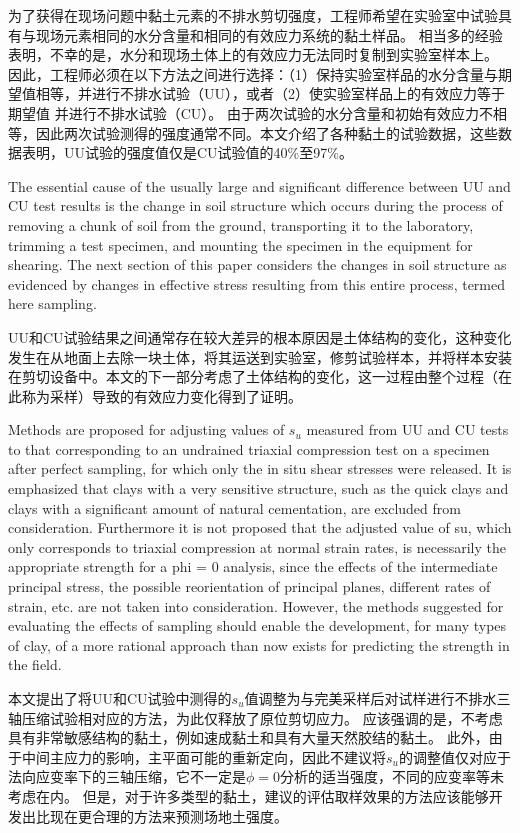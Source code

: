 \begin{paracol}{2}
    \switchcolumn

    为了获得在现场问题中黏土元素的不排水剪切强度，工程师希望在实验室中试验具有与现场元素相同的水分含量和相同的有效应力系统的黏土样品。 相当多的经验表明，不幸的是，水分和现场土体上的有效应力无法同时复制到实验室样本上。 因此，工程师必须在以下方法之间进行选择：（1）保持实验室样品的水分含量与期望值相等，并进行不排水试验（UU），或者（2）使实验室样品上的有效应力等于期望值 并进行不排水试验（CU）。 由于两次试验的水分含量和初始有效应力不相等，因此两次试验测得的强度通常不同。本文介绍了各种黏土的试验数据，这些数据表明，UU试验的强度值仅是CU试验值的40$\%$至97$\%$。

    \switchcolumn*

    The essential cause of the usually large and significant difference between UU and CU test results is the change in soil structure which occurs during the process of removing a chunk of soil from the ground, transporting it to the laboratory, trimming a test specimen, and mounting the specimen in the equipment for shearing. The next section of this paper considers the changes in soil structure as evidenced by changes in effective stress resulting from this entire process, termed here sampling. 

    \switchcolumn

    UU和CU试验结果之间通常存在较大差异的根本原因是土体结构的变化，这种变化发生在从地面上去除一块土体，将其运送到实验室，修剪试验样本，并将样本安装在剪切设备中。本文的下一部分考虑了土体结构的变化，这一过程由整个过程（在此称为采样）导致的有效应力变化得到了证明。

    \switchcolumn*
    
    Methods are proposed for adjusting values of $s_u$ measured from UU and CU tests to that corresponding to an undrained triaxial compression test on a specimen after perfect sampling, for which only the in situ shear stresses were released. It is emphasized that clays with a very sensitive structure, such as the quick clays and clays with a significant amount of natural cementation, are excluded from consideration. Furthermore it is not proposed that the adjusted value of su, which only corresponds to triaxial compression at normal strain rates, is necessarily the appropriate strength for a phi = 0 analysis, since the effects of the intermediate principal stress, the possible reorientation of principal planes, different rates of strain, etc. are not taken into consideration. However, the methods suggested for evaluating the effects of sampling should enable the development, for many types of clay, of a more rational approach than now exists for predicting the strength in the field. 

    \switchcolumn
    
    本文提出了将UU和CU试验中测得的$s_u$值调整为与完美采样后对试样进行不排水三轴压缩试验相对应的方法，为此仅释放了原位剪切应力。 应该强调的是，不考虑具有非常敏感结构的黏土，例如速成黏土和具有大量天然胶结的黏土。 此外，由于中间主应力的影响，主平面可能的重新定向，因此不建议将$s_u$的调整值仅对应于法向应变率下的三轴压缩，它不一定是$\phi=0$分析的适当强度，不同的应变率等未考虑在内。 但是，对于许多类型的黏土，建议的评估取样效果的方法应该能够开发出比现在更合理的方法来预测场地土强度。

\end{paracol}